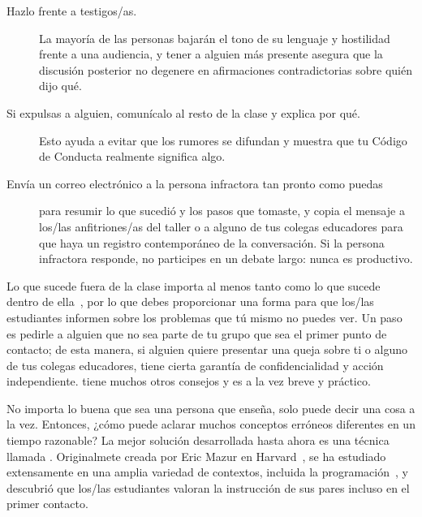 \begin{description}

\item[Hazlo frente a testigos/as.]
  La mayoría de las personas bajarán el tono de su lenguaje y hostilidad frente a una audiencia,
  y tener a alguien más presente asegura que
  la discusión posterior no degenere en afirmaciones contradictorias sobre quién dijo qué.

\item[Si expulsas a alguien, comunícalo al resto de la clase y explica por qué.]
  Esto ayuda a evitar que los rumores se difundan
  y muestra que tu Código de Conducta realmente significa algo.

\item[Envía un correo electrónico a la persona infractora tan pronto como puedas]
  para resumir lo que sucedió y los pasos que tomaste,
  y copia el mensaje a los/las anfitriones/as del taller o a alguno de tus colegas educadores
  para que haya un registro contemporáneo de la conversación.
  Si la persona infractora responde,
  no participes en un debate largo:
  nunca es productivo.
 
\end{description}

Lo que sucede fuera de la clase importa al menos tanto como lo que sucede dentro de ella~\cite{Part2011},
por lo que debes proporcionar una forma para que los/las estudiantes informen sobre los problemas que tú mismo no puedes ver.
Un paso es pedirle a alguien que no sea parte de tu grupo que sea el primer punto de contacto;
de esta manera,
si alguien quiere presentar una queja sobre ti o alguno de tus colegas educadores,
tiene cierta garantía de confidencialidad y acción independiente.
\cite{Auro2019} tiene muchos otros consejos
y es a la vez breve y práctico.


No importa lo buena que sea una persona que enseña,
solo puede decir una cosa a la vez.
Entonces, ¿cómo puede aclarar muchos conceptos erróneos diferentes en un tiempo razonable?
La mejor solución desarrollada hasta ahora es una técnica llamada .
Originalmete creada por Eric Mazur en Harvard~\cite{Mazu1996},
se ha estudiado extensamente en una amplia variedad de contextos,
incluida la programación~\cite{Crou2001,Port2013},
y~\cite{Port2016} descubrió que los/las estudiantes valoran la instrucción de sus pares incluso en el primer contacto.


